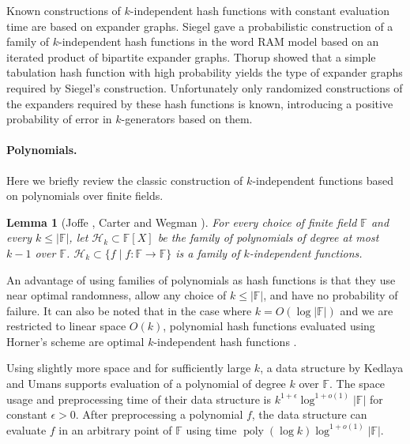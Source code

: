\documentclass[a4paper,11pt]{article}
\theoremstyle{plain}
\newtheorem{lemma}{Lemma}
\theoremstyle{definition}
\newcommand{\F}{\mathbb{F}}
\DeclareMathOperator{\poly}{poly}
\begin{document}
Known constructions of $k$-independent hash functions with constant evaluation time are based on expander graphs.
Siegel \cite{siegel2004} gave a probabilistic construction of a family of \mbox{$k$-independent} hash functions in the word RAM model based on an iterated product of bipartite expander graphs. 
Thorup \cite{thorup2013} showed that a simple tabulation hash function with high probability yields the type of expander graphs required by Siegel's construction.
Unfortunately only randomized constructions of the expanders required by these hash functions is known, introducing a positive probability of error in \mbox{$k$-generators} based on them.

\paragraph{Polynomials.}
Here we briefly review the classic construction of $k$-independent functions based on polynomials over finite fields.  
\begin{lemma}[Joffe \cite{joffe1974}, Carter and Wegman \cite{wegman1981}] \label{lem:kpoly}
For every choice of finite field $\F$ and every $k \leq |\F|$, let $\mathcal{H}_{k} \subset \F[X]$ be the family of polynomials of degree at most $k-1$ over $\F$.
${\mathcal{H}_{k} \subset \{ f \mid f \colon \F \to \F \}}$ is a family of $k$-independent functions.
\end{lemma}

An advantage of using families of polynomials as hash functions is that they use near optimal randomness, allow any choice of $k \leq |\F|$, and have no probability of failure. 
It can also be noted that in the case where $k = O(\log |\F|)$ and we are restricted to linear space $O(k)$, 
polynomial hash functions evaluated using Horner's scheme are optimal \mbox{$k$-independent} hash functions \cite{larsen2012, siegel2004}.   

Using slightly more space and for sufficiently large $k$, a data structure by Kedlaya and Umans \cite{kedlaya2008} supports evaluation of a polynomial of degree $k$ over $\F$.
The space usage and preprocessing time of their data structure is $k^{1 + \epsilon}\log^{1 + o(1)}|\F|$ for constant $\epsilon > 0$.
After preprocessing a polynomial $f$, the data structure can evaluate $f$ in an arbitrary point of $\F$ using time $\poly(\log k)\log^{1 + o(1)}|\F|$.         
\end{document}
